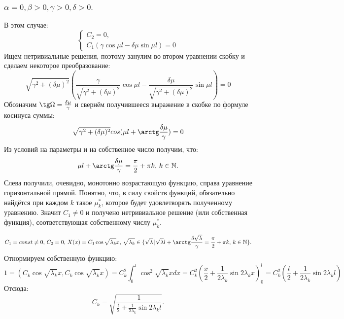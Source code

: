 \documentclass[12pt, a4paper]{article}
\begin{document}
\subsubsection{ $ \alpha = 0, \beta > 0, \gamma > 0, \delta > 0. $}
В этом случае:
\begin{displaymath}
	\begin{cases}
		C_{2} = 0, \\
		C_{1} (\gamma \cos \mu l - \delta \mu \sin \mu l) = 0
	\end{cases}
\end{displaymath}
Ищем нетривиальные решения, поэтому занулим во втором уравнении скобку и сделаем некоторое преобразование:
\[ \sqrt{\gamma ^2 + (\delta \mu)^2 }(\frac{\gamma}{\sqrt{\gamma ^2 + (\delta \mu)^2 }} \cos \mu l - \frac{\delta \mu}{\sqrt{\gamma ^2 + (\delta \mu)^2 }}\sin \mu l) = 0 \]
Обозначим $\tg \Omega = \frac{\delta \mu}{\gamma}$ и свернём получившееся выражение в скобке по формуле косинуса суммы:
\[ \sqrt{\gamma ^2 + (\delta \mu)^2 } cos(\mu l + \arctg  \frac{\delta \mu}{\gamma}) = 0 \]
Из условий на параметры и на собственное число получим, что:
\[ \mu l + \arctg  \frac{\delta \mu}{\gamma} = \frac{\pi}{2} + \pi k, \, k \in \mathbb{N}. \]
Слева получили, очевидно, монотонно возрастающую функцию, справа уравнение горизонтальной прямой. Понятно, что, в силу свойств функций, обязательно найдётся при каждом $k$ такое $\mu ^{*}_{k}$, которое будет удовлетворять полученному уравнению. Значит $C_{1} \ne 0$ и получено нетривиальное решение (или собственная функция), соответствующая собственному числу $\mu ^{*}_{k}$.

\[ C_{1} = const \ne 0, \, C_{2} = 0, \, X(x) = C_{1} \cos \sqrt{\lambda_{k}} x, \, \sqrt{\lambda_{k}} \in \{\sqrt{\lambda} \, | \sqrt{\lambda} l + \arctg  \frac{\delta \sqrt{\lambda}}{\gamma} = \frac{\pi}{2} + \pi k, \, k \in \mathbb{N}\}. \]
Отнормируем собственную функцию:
\[ 1 = (C_{k} \cos \sqrt{\lambda_{k}} x, C_{k} \cos \sqrt{\lambda_{k}} x) = C_{k}^2 \int_{0}^{l}  \cos^2 \sqrt{\lambda_{k}} xdx = C_{k}^2 (\frac{x}{2} + \frac{1}{2\lambda_{k}} \sin 2\lambda_{k} x)_0^l =   C_{k}^2 (\frac{l}{2} + \frac{1}{2\lambda_{k}} \sin 2\lambda_{k} l) \]
Отсюда:
\[ C_{k} = \sqrt{\frac{1}{\frac{l}{2} + \frac{1}{2\lambda_{k}} \sin 2\lambda_{k} l}}. \]
\end{document}
